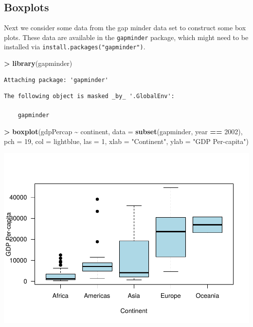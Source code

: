 \documentclass[
]{krantz}
\makeatletter
\newenvironment{Shaded}{\begin{snugshade}}{\end{snugshade}}
\newcommand{\DataTypeTok}[1]{\textcolor[rgb]{0.27,0.27,0.27}{#1}}
\newcommand{\DecValTok}[1]{\textcolor[rgb]{0.06,0.06,0.06}{#1}}
\newcommand{\KeywordTok}[1]{\textcolor[rgb]{0.27,0.27,0.27}{\textbf{#1}}}
\newcommand{\NormalTok}[1]{#1}
\newcommand{\OperatorTok}[1]{\textcolor[rgb]{0.43,0.43,0.43}{\textbf{#1}}}
\newcommand{\StringTok}[1]{\textcolor[rgb]{0.5,0.5,0.5}{#1}}
\newenvironment{kframe}{%
\medskip{}
\setlength{\fboxsep}{.8em}
 \def\at@end@of@kframe{}%
 \ifinner\ifhmode%
  \def\at@end@of@kframe{\end{minipage}}%
  \begin{minipage}{\columnwidth}%
 \fi\fi%
 \def\FrameCommand##1{\hskip\@totalleftmargin \hskip-\fboxsep
 \colorbox{shadecolor}{##1}\hskip-\fboxsep
     \hskip-\linewidth \hskip-\@totalleftmargin \hskip\columnwidth}%
 \MakeFramed {\advance\hsize-\width
   \@totalleftmargin\z@ \linewidth\hsize
   \@setminipage}}%
 {\par\unskip\endMakeFramed%
 \at@end@of@kframe}
\renewenvironment{Shaded}{\begin{kframe}}{\end{kframe}}
\makeatother
\begin{document}
\hypertarget{boxplots-1}{%
\subsection{Boxplots}\label{boxplots-1}}

Next we consider some data from the gap minder data set to construct some box plots. These data are available in the \texttt{gapminder} package, which might need to be installed via \texttt{install.packages("gapminder")}.

\begin{Shaded}
\begin{Highlighting}[]
\OperatorTok{\textgreater{}}\StringTok{ }\KeywordTok{library}\NormalTok{(gapminder)}
\end{Highlighting}
\end{Shaded}

\begin{verbatim}
Attaching package: 'gapminder'
\end{verbatim}

\begin{verbatim}
The following object is masked _by_ '.GlobalEnv':

    gapminder
\end{verbatim}

\begin{Shaded}
\begin{Highlighting}[]
\OperatorTok{\textgreater{}}\StringTok{ }\KeywordTok{boxplot}\NormalTok{(gdpPercap }\OperatorTok{\textasciitilde{}}\StringTok{ }\NormalTok{continent, }\DataTypeTok{data =} \KeywordTok{subset}\NormalTok{(gapminder, year }\OperatorTok{==}\StringTok{ }\DecValTok{2002}\NormalTok{), }\DataTypeTok{pch =} \DecValTok{19}\NormalTok{, }\DataTypeTok{col =} \StringTok{\textquotesingle{}lightblue\textquotesingle{}}\NormalTok{, }\DataTypeTok{las =} \DecValTok{1}\NormalTok{, }\DataTypeTok{xlab =} \StringTok{"Continent"}\NormalTok{, }\DataTypeTok{ylab =} \StringTok{"GDP Per{-}capita"}\NormalTok{)}
\end{Highlighting}
\end{Shaded}

\includegraphics{bookdown_files/figure-latex/unnamed-chunk-354-1.pdf}
\end{document}
